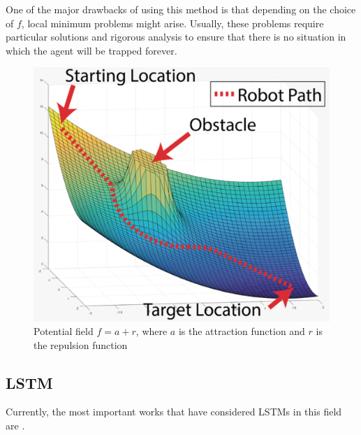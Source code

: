 One of the major drawbacks of using this method is that depending on the choice of $f$, local minimum problems might arise. Usually, these problems require particular solutions and rigorous analysis to ensure that there is no situation in which the agent will be trapped forever.

\begin{figure}[h!]
    \centering
    \includegraphics[scale=0.3]{images/pfm.png}
    \caption{Potential field $f = a + r$, where $a$ is the attraction function and $r$ is the repulsion function \cite{inproceedings}}
    \label{fig:pfm}
\end{figure}

\pagebreak

\subsection{LSTM}
Currently, the most important works that have considered LSTMs in this field are \cite{nicola2018lstm, lee2018lstm, inoue2019robot}.



